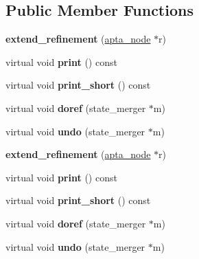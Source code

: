 \subsection*{Public Member Functions}
\begin{DoxyCompactItemize}
\item 
{\bfseries extend\+\_\+refinement} (\hyperlink{classapta__node}{apta\+\_\+node} $\ast$r)\hypertarget{classextend__refinement_aa00190c7c6717a29a97f35d36e4d3ae7}{}\label{classextend__refinement_aa00190c7c6717a29a97f35d36e4d3ae7}

\item 
virtual void {\bfseries print} () const \hypertarget{classextend__refinement_a2a21165129b353dfa8d3acab801be3da}{}\label{classextend__refinement_a2a21165129b353dfa8d3acab801be3da}

\item 
virtual void {\bfseries print\+\_\+short} () const \hypertarget{classextend__refinement_afefa015267afdfa9080b1f87c12a815f}{}\label{classextend__refinement_afefa015267afdfa9080b1f87c12a815f}

\item 
virtual void {\bfseries doref} (state\+\_\+merger $\ast$m)\hypertarget{classextend__refinement_abb1a3f9c5ee0d5badace72bee46320d4}{}\label{classextend__refinement_abb1a3f9c5ee0d5badace72bee46320d4}

\item 
virtual void {\bfseries undo} (state\+\_\+merger $\ast$m)\hypertarget{classextend__refinement_a5421f88fc0063f78c8ec6887985f7e5e}{}\label{classextend__refinement_a5421f88fc0063f78c8ec6887985f7e5e}

\item 
{\bfseries extend\+\_\+refinement} (\hyperlink{classapta__node}{apta\+\_\+node} $\ast$r)\hypertarget{classextend__refinement_aa00190c7c6717a29a97f35d36e4d3ae7}{}\label{classextend__refinement_aa00190c7c6717a29a97f35d36e4d3ae7}

\item 
virtual void {\bfseries print} () const \hypertarget{classextend__refinement_a5c11c0e4110614ef6b0366257abd9d6d}{}\label{classextend__refinement_a5c11c0e4110614ef6b0366257abd9d6d}

\item 
virtual void {\bfseries print\+\_\+short} () const \hypertarget{classextend__refinement_a4e331a6e52fbc9c65effa8825ac73f02}{}\label{classextend__refinement_a4e331a6e52fbc9c65effa8825ac73f02}

\item 
virtual void {\bfseries doref} (state\+\_\+merger $\ast$m)\hypertarget{classextend__refinement_ad650a724613bf21e37ca82140722f20e}{}\label{classextend__refinement_ad650a724613bf21e37ca82140722f20e}

\item 
virtual void {\bfseries undo} (state\+\_\+merger $\ast$m)\hypertarget{classextend__refinement_a343c824964799b67b60d83594c221529}{}\label{classextend__refinement_a343c824964799b67b60d83594c221529}

\end{DoxyCompactItemize}
